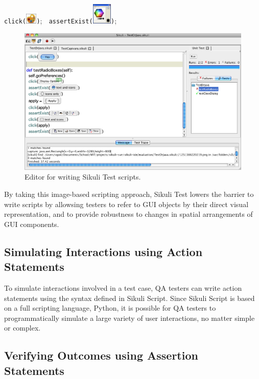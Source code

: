 \documentclass{chi2009}
\begin{document}
\verb|click(|\includegraphics[height=0.2in]{figures/palette.png}\verb|)|; $\;$
\verb|assertExist(|\includegraphics[height=0.4in]{figures/color-dialog.png}\verb|)|;


\begin{figure}
\center
\includegraphics[width=1.5\columnwidth]{figures/editor.png}
\caption{Editor for writing Sikuli Test scripts.}
\end{figure}

By taking this image-based scripting approach, Sikuli Test 
lowers the barrier to write scripts by
allowsing testers to refer to GUI objects by their
direct visual representation, and to provide robustness to
changes in spatial arrangements of GUI components.

\subsection{Simulating Interactions using Action Statements}

To simulate interactions involved in a test case, QA testers can
write action statements using the syntax defined in Sikuli Script.
Since Sikuli Script is based on a full scripting language,
Python, it is possible for QA testers to programmatically
simulate a large variety of user interactions, no matter simple or
complex.

\subsection{Verifying Outcomes using Assertion Statements}
\end{document}
